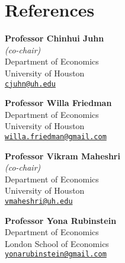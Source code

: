 \documentclass[10pt,letterpaper]{article}
\begin{document}
\section*{References}

\begin{minipage}[t]{0.45\textwidth}
  \textbf{Professor Chinhui Juhn}  \\
  \textit{(co-chair)}  \\
                   Department of Economics \\
                   University of Houston  \\
                   \href{mailto:cjuhn@uh.edu}{\tt cjuhn@uh.edu} \\
\end{minipage}
\begin{minipage}[t]{0.45\textwidth}
   \textbf{Professor Willa Friedman}  \\
                   Department of Economics \\
                   University of Houston  \\
                   \href{mailto:willa.friedman@gmail.com}{\tt willa.friedman@gmail.com} \\
\end{minipage}

\begin{minipage}[t]{0.45\textwidth}
   \textbf{Professor Vikram Maheshri}  \\
   \textit{(co-chair)}  \\
                   Department of Economics \\
                   University of Houston  \\
                   \href{mailto:vmaheshri@uh.edu}{\tt vmaheshri@uh.edu} \\
\end{minipage}
\begin{minipage}[t]{0.45\textwidth}
   \textbf{Professor Yona Rubinstein}  \\
                   Department of Economics \\
                   London School of Economics  \\
                   \href{mailto:yonarubinstein@gmail.com}{\tt yonarubinstein@gmail.com} \\
\end{minipage}

\end{document}
